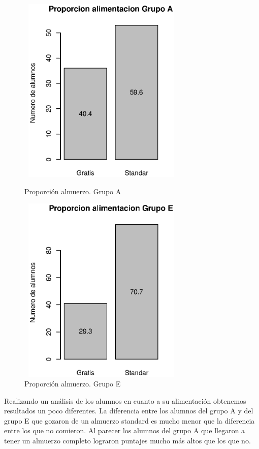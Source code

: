 \documentclass{article}
\begin{document}
    
    \begin{figure}[H]
        \begin{minipage}[b]{0.45\linewidth}
            \includegraphics[width=8cm,height = 9cm]{Output/Plots/figura13.eps}
            \vspace*{-15mm}
            \caption{Proporci\'on almuerzo. Grupo A}
            \label{fig:minipage1}
        \end{minipage}
        \hspace{0.2cm}
        \begin{minipage}[b]{0.45\linewidth}
            \includegraphics[width=8cm,height = 9cm]{Output/Plots/figura14.eps}
            \vspace*{-15mm}
            \caption{Proporci\'on almuerzo. Grupo E}
            \label{fig:minipage2}
        \end{minipage}
    \end{figure}

    Realizando un an\'alisis de los alumnos en cuanto a su alimentaci\'on obtenemos resultados un poco diferentes.
    La diferencia entre los alumnos del grupo A y del grupo E que gozaron de un almuerzo standard es mucho menor
    que la diferencia entre los que no comieron. Al parecer los alumnos del grupo A que llegaron a tener un almuerzo
    completo lograron puntajes mucho m\'as altos que los que no.
\end{document}
